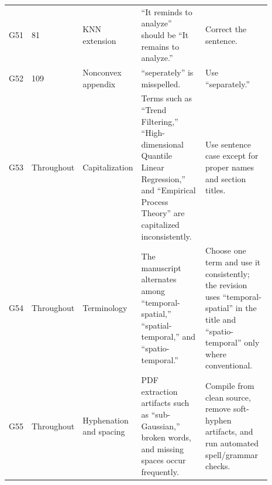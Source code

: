 \documentclass[11pt]{article}
\begin{document}
\begin{landscape}
\begin{longtable}{L{0.045\linewidth}L{0.065\linewidth}L{0.16\linewidth}L{0.31\linewidth}L{0.31\linewidth}}
G51 & 81 & KNN extension & “It reminds to analyze” should be “It remains to analyze.” & Correct the sentence.\\
G52 & 109 & Nonconvex appendix & “seperately” is misspelled. & Use “separately.”\\
G53 & Throughout & Capitalization & Terms such as “Trend Filtering,” “High-dimensional Quantile Linear Regression,” and “Empirical Process Theory” are capitalized inconsistently. & Use sentence case except for proper names and section titles.\\
G54 & Throughout & Terminology & The manuscript alternates among “temporal-spatial,” “spatial-temporal,” and “spatio-temporal.” & Choose one term and use it consistently; the revision uses “temporal-spatial” in the title and “spatio-temporal” only where conventional.\\
G55 & Throughout & Hyphenation and spacing & PDF extraction artifacts such as “sub-Gaussian,” broken words, and missing spaces occur frequently. & Compile from clean source, remove soft-hyphen artifacts, and run automated spell/grammar checks.\\
\end{longtable}
\end{landscape}
\clearpage
\end{document}
